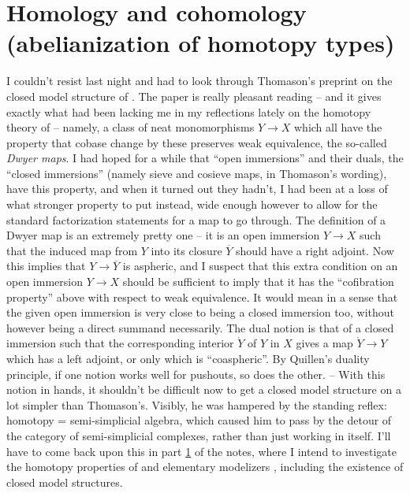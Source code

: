 
\chapter{Homology and cohomology (abelianization of homotopy types)}
\label{ch:V}

\noindent\hfill{}\par

\label{sec:87}%
I couldn't resist last night and had to look through Thomason's
preprint on the closed model structure of
\Cat. The paper is really pleasant
reading -- and it gives exactly what had been lacking me in my
reflections lately on the homotopy theory of \Cat{} -- namely, a class
of neat monomorphisms $Y\to X$ which all have the property that cobase
change by these preserves weak equivalence, the so-called \emph{Dwyer
  maps}. I
had hoped for a while that ``open immersions'' and their duals, the
``closed immersions'' (namely sieve and cosieve maps, in Thomason's
wording), have this property, and when it turned out they hadn't, I
had been at a loss of what stronger property to put instead, wide
enough however to allow for the standard factorization statements for
a map to go through. The definition of a Dwyer map is an extremely
pretty one -- it is an open immersion $Y\to X$ such that the induced
map from $Y$ into its closure $\overline Y$ should have a right
adjoint. Now this implies that $Y\to\overline Y$ is aspheric, and I
suspect that this extra condition on an open immersion $Y\to X$ should
be sufficient to imply that it has the ``cofibration property'' above
with respect to weak equivalence. It would mean in a sense that the
given open immersion is very close to being a closed immersion too,
without however being a direct summand necessarily. The dual notion is
that of a closed immersion such that the corresponding interior
$\mathring Y$ of $Y$ in $X$ gives a map $\mathring Y \to Y$ which has
a left adjoint, or only which is ``coaspheric''. By Quillen's duality
principle, if one notion works well for pushouts, so does the
other. -- With this notion in hands, it shouldn't be difficult now to
get a closed model structure on \Cat{} a lot simpler than
Thomason's. Visibly, he was hampered by the standing reflex: homotopy
= semi-simplicial algebra, which caused him to pass by the detour of
the category \Simplexhat{} of semi-simplicial complexes, rather than
just working in \Cat{} itself. I'll have to come back upon this in
part \ref{ch:V} of the notes, where I intend to investigate the
homotopy properties of \Cat{} and elementary modelizers \Ahat,
including the existence of closed model structures.

